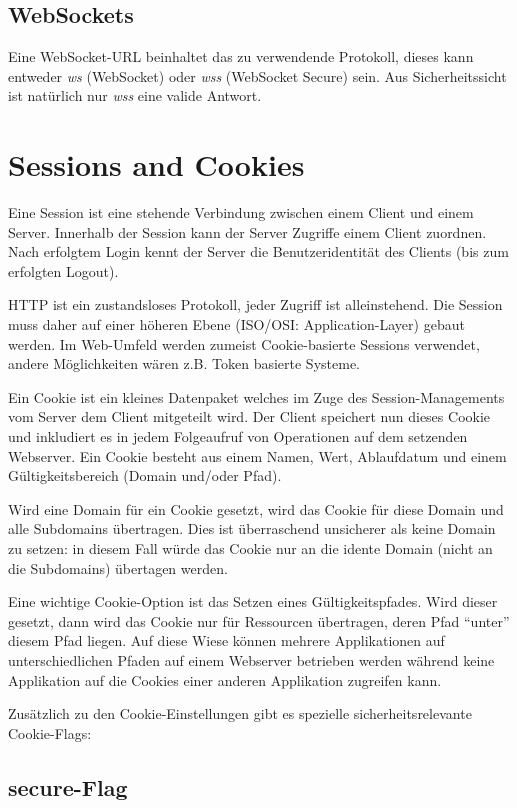 \subsection{WebSockets}

Eine WebSocket-URL beinhaltet das zu verwendende Protokoll, dieses kann entweder \textit{ws} (WebSocket) oder \textit{wss} (WebSocket Secure) sein. Aus Sicherheitssicht ist natürlich nur \textit{wss} eine valide Antwort.

\section{Sessions and Cookies}

Eine Session ist eine stehende Verbindung zwischen einem Client und einem Server. Innerhalb der Session kann der Server Zugriffe einem Client zuordnen. Nach erfolgtem Login kennt der Server die Benutzeridentität des Clients (bis zum erfolgten Logout).

HTTP ist ein zustandsloses Protokoll, jeder Zugriff ist alleinstehend. Die Session muss daher auf einer höheren Ebene (ISO/OSI: Application-Layer) gebaut werden. Im Web-Umfeld werden zumeist Cookie-basierte Sessions verwendet, andere Möglichkeiten wären z.B. Token basierte Systeme.

Ein Cookie ist ein kleines Datenpaket welches im Zuge des Session-Managements vom Server dem Client mitgeteilt wird. Der Client speichert nun dieses Cookie und inkludiert es in jedem Folgeaufruf von Operationen auf dem setzenden Webserver. Ein Cookie besteht aus einem Namen, Wert, Ablaufdatum und einem Gültigkeitsbereich (Domain und/oder Pfad).

Wird eine Domain für ein Cookie gesetzt, wird das Cookie für diese Domain und alle Subdomains übertragen. Dies ist überraschend unsicherer als keine Domain zu setzen: in diesem Fall würde das Cookie nur an die idente Domain (nicht an die Subdomains) übertagen werden.

Eine wichtige Cookie-Option ist das Setzen eines Gültigkeitspfades. Wird dieser gesetzt, dann wird das Cookie nur für Ressourcen übertragen, deren Pfad ``unter'' diesem Pfad liegen. Auf diese Wiese können mehrere Applikationen auf unterschiedlichen Pfaden auf einem Webserver betrieben werden während keine Applikation auf die Cookies einer anderen Applikation zugreifen kann.

Zusätzlich zu den Cookie-Einstellungen gibt es spezielle sicherheitsrelevante Cookie-Flags:

\subsection{secure-Flag}

